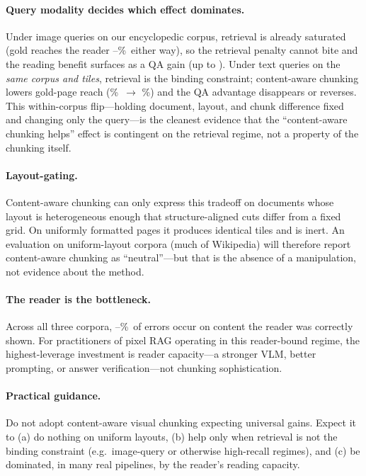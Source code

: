 \documentclass[11pt]{article}
\begin{document}
\paragraph{Query modality decides which effect dominates.} Under image queries on our encyclopedic
corpus, retrieval is already saturated (gold reaches the reader \ImgFixedSawGold--\ImgCaSawGold\%\ either
way), so the retrieval penalty cannot bite and the reading benefit surfaces as a QA gain (up to
\CaImgHierDelta). Under text queries on the \emph{same corpus and tiles}, retrieval is the binding
constraint; content-aware chunking lowers gold-page reach (\TxtFixedSawGold\%\ $\to$ \TxtCaSawGold\%) and
the QA advantage disappears or reverses. This within-corpus flip---holding document, layout, and chunk
difference fixed and changing only the query---is the cleanest evidence that the ``content-aware chunking
helps'' effect is contingent on the retrieval regime, not a property of the chunking itself.

\paragraph{Layout-gating.} Content-aware chunking can only express this tradeoff on documents whose
layout is heterogeneous enough that structure-aligned cuts differ from a fixed grid. On uniformly
formatted pages it produces identical tiles and is inert. An evaluation on uniform-layout corpora (much
of Wikipedia) will therefore report content-aware chunking as ``neutral''---but that is the absence of a
manipulation, not evidence about the method.

\paragraph{The reader is the bottleneck.} Across all three corpora,
\ReaderCeilPctMin--\ReaderCeilPctMax\%\ of errors occur on content the reader was correctly shown. For
practitioners of pixel RAG operating in this reader-bound regime, the highest-leverage investment is
reader capacity---a stronger VLM, better prompting, or answer verification---not chunking sophistication.

\paragraph{Practical guidance.} Do not adopt content-aware visual chunking expecting universal gains.
Expect it to (a) do nothing on uniform layouts, (b) help only when retrieval is not the binding
constraint (e.g.\ image-query or otherwise high-recall regimes), and (c) be dominated, in many real
pipelines, by the reader's reading capacity.
\end{document}
